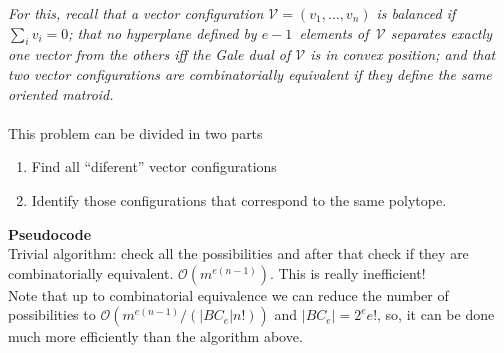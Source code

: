 \documentclass[11pt]{article}
\newcommand{\VV}{\mathcal{V}}
\begin{document}
\emph{For this, recall that a vector configuration $\VV = (v_1,\dots,v_n)$ is balanced if $\sum_i v_i=0$;
that no hyperplane defined by $e-1$~elements of~$\VV$ separates   exactly one vector from the others iff the Gale dual of $\VV$ is in   convex position; and that two vector configurations are combinatorially equivalent if they define the same oriented matroid.}
\\\\This problem can be divided in two parts
\begin{enumerate}
	\item Find all ``diferent'' vector configurations
	\item Identify those configurations that correspond to the same polytope.
\end{enumerate}
\textbf{Pseudocode}
\\Trivial algorithm: check all the possibilities and after that check if they are combinatorially equivalent. $\mathcal{O}(m^{e(n-1)})$. This is really inefficient!
\\Note that up to combinatorial equivalence we can reduce the number of possibilities to $\mathcal{O}(m^{e(n-1)}/(|BC_e|n!))$ and $|BC_e| = 2^e e!$, so, it can be done much more efficiently than the algorithm above.
\end{document}
